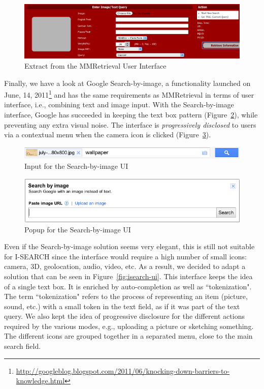\documentclass[runningheads,a4paper]{llncs} \usepackage[utf8]{inputenc}
\begin{document}
\begin{figure}[h!]
  \centering
    \includegraphics[width=0.8\linewidth]{resources/mmretrieval-UI.png}
  \caption{Extract from the MMRetrieval User Interface}
  \label{fig:mmretrieval-ui}
\end{figure}

Finally, we have a look at Google Search-by-image, a functionality launched on June, 14, 2011\footnote{\url{http://googleblog.blogspot.com/2011/06/knocking-down-barriers-to-knowledge.html}} and has the same requirements as MMRetrieval in terms of user interface, i.e., combining text and image input. With the Search-by-image interface, Google has succeeded in keeping the text box pattern (Figure~\ref{fig:search-by-image-box}), while preventing any extra visual noise. The interface is \emph{progressively disclosed} to users via a contextual menu when the camera icon is clicked (Figure~\ref{fig:search-by-image-popup}).

\begin{figure}[h!]
  \centering
    \includegraphics[width=0.8\linewidth]{resources/search-by-image-UI-box.png}
  \caption{Input for the Search-by-image UI}
  \label{fig:search-by-image-box}
\end{figure}

\begin{figure}[h!]
  \centering
    \includegraphics[width=0.8\linewidth]{resources/search-by-image-UI-popup.png}
  \caption{Popup for the Search-by-image UI}
  \label{fig:search-by-image-popup}
\end{figure}

Even if the Search-by-image solution seems very elegant, this is still not suitable for \mbox{I-SEARCH} since the interface would require a high number of small icons: camera, 3D, geolocation, audio, video, etc.  As a result, we decided to adapt a solution that can be seen in Figure~\ref{fig:isearch-ui}. This interface keeps the idea of a single text box. It is enriched by auto-completion as well as ``tokenization". The term ``tokenization" refers to the process of representing an item (picture, sound, etc.) with a small token in the text field, as if it was part of the text query. We also kept the idea of progressive disclosure for the different actions required by the various modes, e.g., uploading a picture or sketching something. The different icons are grouped together in a separated menu, close to the main search field.
\end{document}

